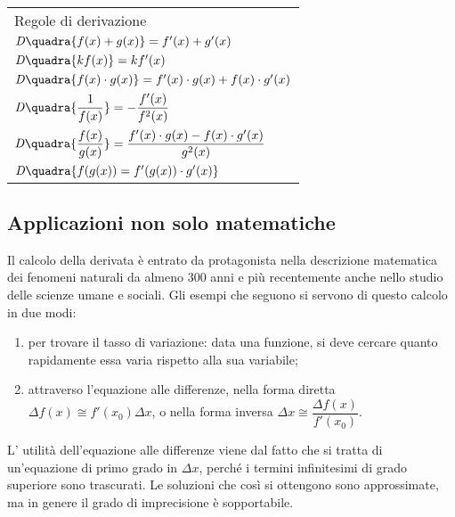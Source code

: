 \begin{center}
\begin{tabular}{l}
\vspace{.5em}  Regole di derivazione\\\vspace{.5em}
$\mathit{D}\quadra{f(x)+g(x)}=f'(x)+g'(x)$\\\vspace{.5em}
$\mathit{D}\quadra{kf(x)}=kf'(x)$\\\vspace{.5em}
$\mathit{D}\quadra{f(x)\cdot g(x)}=f'(x)\cdot g(x)+f(x)\cdot 
g'(x)$\\\vspace{.5em}
$\mathit{D}\quadra{\dfrac{1}{f(x)}}=-\dfrac{f'(x)}{f^2(x)}$\\\vspace{.5em}
$\mathit{D}\quadra{\dfrac{f(x)}{g(x)}}=\dfrac{f'(x)\cdot g(x)-f(x)
    \cdot g'(x)}{g^2(x)}$\\\vspace{.5em}
$\mathit{D}\quadra{f(g(x))=f'(g(x))\cdot g'(x)}$
\end{tabular}
\end{center}
\label{tab:diff01_regolederivazione}


\subsection{Applicazioni non solo matematiche}
Il calcolo della derivata è entrato da protagonista nella descrizione 
matematica dei fenomeni naturali da almeno $300$ anni e più recentemente
anche nello studio delle scienze umane e sociali. 
Gli esempi che seguono si servono di questo calcolo in due modi:
\begin{enumerate}[noitemsep]
 \item per trovare il tasso di variazione:
data una funzione, si deve cercare quanto rapidamente essa varia rispetto
alla sua variabile;
 \item attraverso l'equazione alle differenze, 
nella forma diretta $\Delta f(x)\cong f'(x_0)\Delta x$, o nella forma
inversa $\Delta x \cong \dfrac{\Delta f(x)}{f'(x_0)}$.
\end{enumerate}
L' utilità dell'equazione alle differenze viene dal
fatto che si tratta di un'equazione di primo grado in $\Delta x$, perché i 
termini infinitesimi di grado superiore sono trascurati. Le soluzioni che 
così si ottengono sono approssimate, ma in genere il grado di imprecisione è 
sopportabile.

